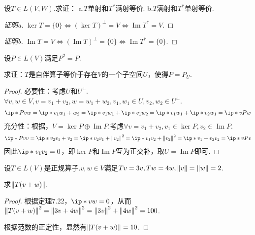 \begin{problem}[4]\label{7.A.4}
    设\(T \in L(V,W)\).求证：
    a.\(T\)单射和\(T^*\)满射等价. \quad b.\(T\)满射和\(T^*\)单射等价.
\end{problem}

\begin{proof}[证明a]
    \(\ker T=\{0\} \Leftrightarrow (\ker T)^\bot=V \Leftrightarrow \operatorname{Im} T^*=V\).
\end{proof}

\begin{proof}[证明b]
    \(\operatorname{Im} T=V \Leftrightarrow (\operatorname{Im} T)^\bot=\{0\} \Leftrightarrow \operatorname{Im} T^*=\{0\}\).
\end{proof}

\begin{problem}[11]\label{7.A.11}
    设\(P \in L(V)\)满足\(P^2=P\).
    
    求证：\(T\)是自伴算子等价于存在\(V\)的一个子空间\(U\)，使得\(P=P_U\).
\end{problem}

\begin{proof}
    必要性：考虑\(U\)和\(U^\bot\).\(\forall v,w \in V,v=v_1+v_2,w=w_1+w_2,v_1,w_1 \in U,v_2,w_2 \in U^\bot\).
    \begin{align*}
        \ip*{Pv}{w}=\ip*{v_1}{w_1+w_2}=\ip*{v_1}{w_1}+\ip*{v_1}{w_2}=\ip*{v_1}{w_1}+\ip*{v_2}{w_1}=\ip*{v}{Pw}
    \end{align*}
    充分性：根据，\(V= \ker P \oplus \operatorname{Im} P\).考虑\(\forall v=v_1+v_2,v_1 \in \ker P,v_2 \in \operatorname{Im} P\).
    \begin{align*}
        \ip*{Pv}{v}=\ip*{v_2}{v_1+v_2}=\ip*{v_2}{v_1}+\norm*{v_2}^2
        =\ip*{v_1}{v_2}+\norm*{v_2}^2=\ip*{v_1+v_2}{v_2}=\ip*{v}{Pv}
    \end{align*}
    因此\(\ip*{v_1}{v_2}=0\)，即\(\ker P\)和\(\operatorname{Im} P\)互为正交补，取\(U=\operatorname{Im} P\)即可.
\end{proof}

\newpage

\begin{problem}[14]\label{7.A.14}
    设\(T \in L(V)\)是正规算子.\(v,w \in V\)满足\(Tv=3v,Tw=4w,\norm*{v}=\norm*{w}=2\).

    求\(\norm*{T(v+w)}\).
\end{problem}

\begin{proof}
    根据定理7.22，\(\ip*{v}{w}=0\)，从而\(\norm*{T(v+w)}^2=\norm*{3v+4w}^2=\norm*{3v}^2+\norm*{4w}^2=100\).
    
    根据范数的正定性，显然有\(\norm*{T(v+w)}=10\).
\end{proof}

